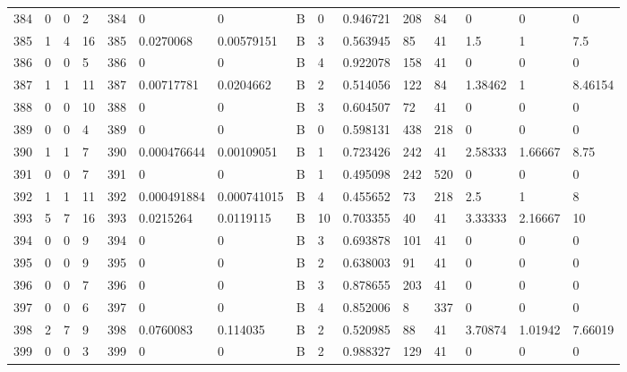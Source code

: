\begin{latin}
\begin{longtable}{lllllllllllllll}
	384 & 0  & 0   & 2  & 384 & 0              & 0              & B & 0  & 0.946721 & 208  & 84   & 0       & 0       & 0       \\
	385 & 1  & 4   & 16 & 385 & 0.0270068      & 0.00579151     & B & 3  & 0.563945 & 85   & 41   & 1.5     & 1       & 7.5     \\
	386 & 0  & 0   & 5  & 386 & 0              & 0              & B & 4  & 0.922078 & 158  & 41   & 0       & 0       & 0       \\
	387 & 1  & 1   & 11 & 387 & 0.00717781     & 0.0204662      & B & 2  & 0.514056 & 122  & 84   & 1.38462 & 1       & 8.46154 \\
	388 & 0  & 0   & 10 & 388 & 0              & 0              & B & 3  & 0.604507 & 72   & 41   & 0       & 0       & 0       \\
	389 & 0  & 0   & 4  & 389 & 0              & 0              & B & 0  & 0.598131 & 438  & 218  & 0       & 0       & 0       \\
	390 & 1  & 1   & 7  & 390 & 0.000476644    & 0.00109051     & B & 1  & 0.723426 & 242  & 41   & 2.58333 & 1.66667 & 8.75    \\
	391 & 0  & 0   & 7  & 391 & 0              & 0              & B & 1  & 0.495098 & 242  & 520  & 0       & 0       & 0       \\
	392 & 1  & 1   & 11 & 392 & 0.000491884    & 0.000741015    & B & 4  & 0.455652 & 73   & 218  & 2.5     & 1       & 8       \\
	393 & 5  & 7   & 16 & 393 & 0.0215264      & 0.0119115      & B & 10 & 0.703355 & 40   & 41   & 3.33333 & 2.16667 & 10      \\
	394 & 0  & 0   & 9  & 394 & 0              & 0              & B & 3  & 0.693878 & 101  & 41   & 0       & 0       & 0       \\
	395 & 0  & 0   & 9  & 395 & 0              & 0              & B & 2  & 0.638003 & 91   & 41   & 0       & 0       & 0       \\
	396 & 0  & 0   & 7  & 396 & 0              & 0              & B & 3  & 0.878655 & 203  & 41   & 0       & 0       & 0       \\
	397 & 0  & 0   & 6  & 397 & 0              & 0              & B & 4  & 0.852006 & 8    & 337  & 0       & 0       & 0       \\
	398 & 2  & 7   & 9  & 398 & 0.0760083      & 0.114035       & B & 2  & 0.520985 & 88   & 41   & 3.70874 & 1.01942 & 7.66019 \\
	399 & 0  & 0   & 3  & 399 & 0              & 0              & B & 2  & 0.988327 & 129  & 41   & 0       & 0       & 0       \\

\end{longtable}
\end{latin}

